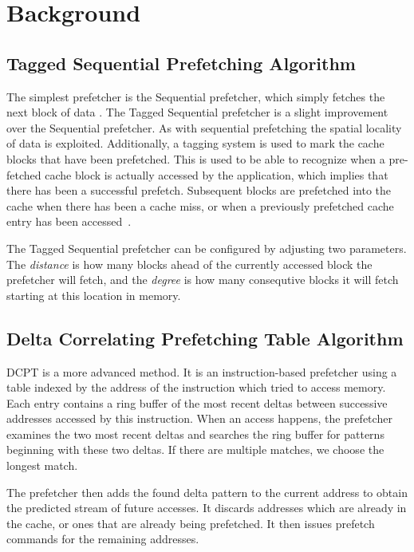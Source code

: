 \section{Background}


\subsection{Tagged Sequential Prefetching Algorithm}

The simplest prefetcher is the Sequential prefetcher, which simply fetches the
next block of data \cite{seq}. The Tagged Sequential prefetcher is a slight
improvement over the Sequential prefetcher. As with sequential prefetching the
spatial locality of data is exploited. Additionally, a tagging system is used to
mark the cache blocks that have been prefetched. This is used to be able to
recognize when a pre-fetched cache block is actually accessed by the
application, which implies that there has been a successful prefetch. Subsequent
blocks are prefetched into the cache when there has been a cache miss, or when a
previously prefetched cache entry has been accessed~\cite{grannaes}.

The Tagged Sequential prefetcher can be configured by adjusting two parameters.
The \emph{distance} is how many blocks ahead of the currently accessed block the
prefetcher will fetch, and the \emph{degree} is how many consequtive blocks it
will fetch starting at this location in memory.

\subsection{Delta Correlating Prefetching Table Algorithm}

DCPT is a more advanced method. It is an instruction-based prefetcher using a
table indexed by the address of the instruction which tried to access memory.
Each entry contains a ring buffer of the most recent deltas between successive
addresses accessed by this instruction. When an access happens, the prefetcher
examines the two most recent deltas and searches the ring buffer for patterns
beginning with these two deltas. If there are multiple matches, we choose the
longest match.

The prefetcher then adds the found delta pattern to the current address to
obtain the predicted stream of future accesses. It discards addresses which
are already in the cache, or ones that are already being prefetched. It then
issues prefetch commands for the remaining addresses.

